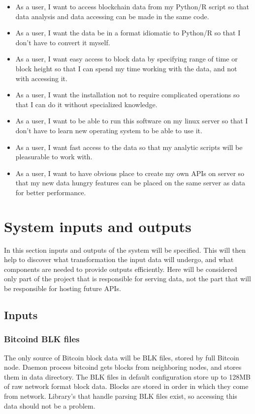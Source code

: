 \documentclass[12pt, en, eng, oneside]{mgr}
\begin{document}
\begin{itemize}
\item
As a user, I want to access blockchain data from my Python/R script so that data analysis and data accessing can be made in the same code.
\item
As a user, I want the data be in a format idiomatic to Python/R so that I don't have to convert it myself.
\item
As a user, I want easy access to block data by specifying range of time or block height so that I can spend my time working with the data, and not with accessing it.
\item
As a user, I want the installation not to require complicated operations so that I can do it without specialized knowledge.
\item
As a user, I want to be able to run this software on my linux server so that I don't have to learn new operating system to be able to use it.
\item
As a user, I want fast access to the data so that my analytic scripts will be pleasurable to work with.
\item
As a user, I want to have obvious place to create my own APIs on server so that my new data hungry features can be placed on the same server as data for better performance.
\end{itemize}



\section{System inputs and outputs}

In this section inputs and outputs of the system will be specified. This will then help to discover what transformation the input data will undergo, and what components are needed to provide outputs efficiently. Here will be considered only part of the project that is responsible for serving data, not the part that will be responsible for hosting future APIs.

\subsection{Inputs}
\subsubsection{Bitcoind BLK files}
The only source of Bitcoin block data will be BLK files, stored by full Bitcoin node. Daemon process bitcoind gets blocks from neighboring nodes, and stores them in data directory. The BLK files in default configuration store up to 128MB of raw network format block data. Blocks are stored in order in which they come from network. Library's that handle parsing BLK files exist, so accessing this data should not be a problem.
\end{document}
